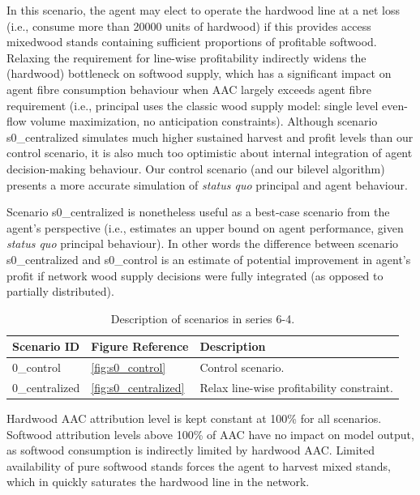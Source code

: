 In this scenario, the agent may elect to operate the hardwood line at a net loss (i.e., consume more than 20000 units of hardwood) if this provides access mixedwood stands containing sufficient proportions of profitable softwood.
Relaxing the requirement for line-wise profitability indirectly widens the (hardwood) bottleneck on softwood supply, which has a significant impact on agent fibre consumption behaviour when AAC largely exceeds agent fibre requirement (i.e., principal uses the classic wood supply model: single level even-flow volume maximization, no anticipation constraints).
Although scenario s0\_centralized simulates much higher sustained harvest and profit levels than our control scenario, it is also much too optimistic about internal integration of agent decision-making behaviour. 
Our control scenario (and our bilevel algorithm) presents a more accurate simulation of \emph{status quo} principal and agent behaviour.

Scenario s0\_centralized is nonetheless useful as a best-case scenario from the agent's perspective (i.e., estimates an upper bound on agent performance, given \emph{status quo} principal behaviour). 
In other words the difference between scenario s0\_centralized and s0\_control is an estimate of potential improvement in agent's profit if network wood supply decisions were fully integrated (as opposed to partially distributed).

\begin{table}
  \centering
  \begin{tabular}{lll}
    \hline
    Scenario ID & Figure Reference & Description \\
    \hline
    0\_control & \ref{fig:s0_control} & Control scenario. \\
    0\_centralized & \ref{fig:s0_centralized} & Relax line-wise profitability constraint. \\
    \hline
  \end{tabular}
  \caption{Description of scenarios in series 6-4.}
  \label{tab:scenario_list}
\end{table}

Hardwood AAC attribution level is kept constant at 100\% for all scenarios. 
Softwood attribution levels above 100\% of AAC have no impact on model output, as softwood consumption is indirectly limited by hardwood AAC.
Limited availability of pure softwood stands forces the agent to harvest mixed stands, which in quickly saturates the hardwood line in the network.

